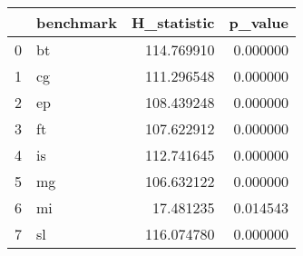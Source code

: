 \begin{tabular}{llrr}
\toprule
 & benchmark & H_statistic & p_value \\
\midrule
0 & bt & 114.769910 & 0.000000 \\
1 & cg & 111.296548 & 0.000000 \\
2 & ep & 108.439248 & 0.000000 \\
3 & ft & 107.622912 & 0.000000 \\
4 & is & 112.741645 & 0.000000 \\
5 & mg & 106.632122 & 0.000000 \\
6 & mi & 17.481235 & 0.014543 \\
7 & sl & 116.074780 & 0.000000 \\
\bottomrule
\end{tabular}
